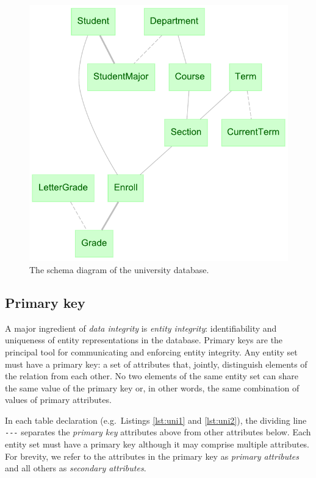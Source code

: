 \documentclass[letter,10pt]{article}
\begin{document}
\begin{figure}
\includegraphics[width=\columnwidth]{uni_erd.pdf}
\caption{The schema diagram of the university database.}
\label{fig:erd}
\end{figure}


\subsection{Primary key}
A major ingredient of \emph{data integrity} is \emph{entity integrity}: identifiability and uniqueness of entity representations in the database. 
{Primary keys} are the principal tool for communicating and enforcing entity integrity. 
Any entity set must have a primary key: a set of attributes that, jointly, distinguish elements of the relation from each other.
No two elements of the same entity set can share the same value of the primary key or, in other words, the same combination of values of primary attributes.

In each table declaration (e.g.\ Listings \ref{lst:uni1} and \ref{lst:uni2}), the dividing line \lstinline$---$ separates the \emph{primary key} attributes above from other attributes below.  
Each entity set must have a primary key although it may comprise multiple attributes. 
For brevity, we refer to the attributes in the primary key as \emph{primary attributes} and all others as \emph{secondary attributes}.
\end{document}
